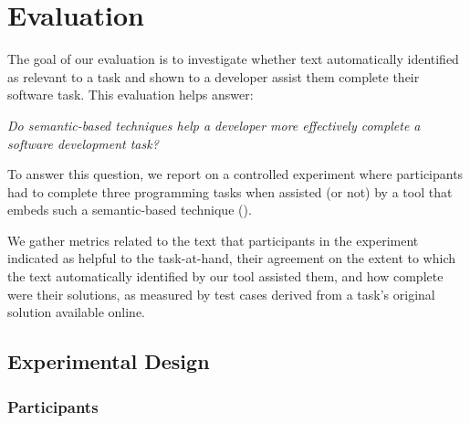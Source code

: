 \clearpage

\section{Evaluation}
\label{cp6:evaluation}



The goal of our evaluation is to investigate whether text automatically identified
as relevant to a task and shown to a developer assist them complete their software task.
This evaluation helps answer: 


\medskip
\begin{bluequote}
    \textit{ Do semantic-based techniques help a 
    developer more effectively complete a software development task?} 
\end{bluequote}




To answer this question, we report on a controlled experiment where participants 
had to complete three programming tasks when assisted (or not) by a
 tool that embeds such a semantic-based technique (). 


We gather metrics related to the text that participants in the experiment indicated as helpful to the task-at-hand, their agreement on the extent to which the text automatically identified by our tool 
assisted them, and how complete were their solutions, as measured by test cases derived from a task's original solution available online.










\subsection{Experimental Design}


\subsubsection{Participants}



